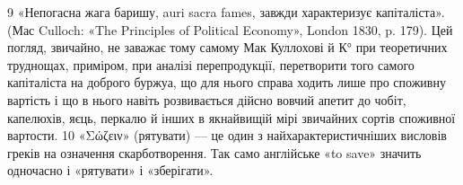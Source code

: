 9 «Непогасна жага баришу, auri sacra fames, завжди характеризує
капіталіста». (Мас Culloch: «The Principles of Political Economy»,
London 1830, p. 179). Цей погляд, звичайно, не заважає тому самому
Мак Куллохові й К° при теоретичних труднощах, приміром, при аналізі
перепродукції, перетворити того самого капіталіста на доброго буржуа,
що для нього справа ходить лише про споживну вартість і що в нього
навіть розвивається дійсно вовчий апетит до чобіт, капелюхів, яєць,
перкалю й інших в якнайвищій мірі звичайних сортів споживної вартости.
10 «Σώζειν» (рятувати) — це один з найхарактеристичніших висловів
греків на означення скарботворення. Так само англійське «to save» значить
одночасно і «рятувати» і «зберігати».